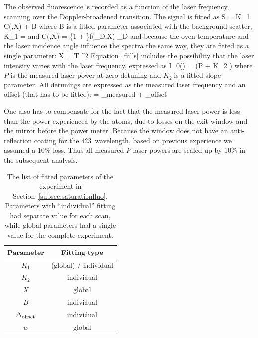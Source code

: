 The observed fluorescence is recorded as a function of the laser frequency, scanning over the Doppler-broadened transition. The signal is fitted as
\be 
S = K_1 C(\Delta,X) + B  
\label{fulls}
\ee
where B is a fitted parameter associated with the background scatter, 
\be
K_1 = 
\ee
and
\be
C(\Delta,X) = \int \ln \left\{1 + \right\}f(\Delta_D,X) \der\Delta_D
\ee
and because the oven temperature and the laser incidence angle influence the spectra the same way, they are fitted as a single parameter:
\be 
X = T \cos^2 \theta
\label{tcosth}
\ee
Equation~\ref{fulls} includes the possibility that the laser intensity varies with the laser frequency, expressed as
\be
I_0(\Delta) =  (P + K_2 \Delta)
\ee
where $P$ is the measured laser power at zero detuning and $K_2$ is a fitted slope parameter. All detunings are expressed as the measured laser frequency and an offset (that has to be fitted):
\be
\Delta = \Delta_{\rm measured} + \Delta_{\rm offset}
\ee

One also has to compensate for the fact that the measured laser power is less than the power experienced by the atoms, due to losses on the exit window and the mirror before the power meter. Because the window does not have an anti-reflection coating for the 423\nm\, wavelength, based on previous experience we assumed a 10\% loss. Thus all measured $P$ laser powers are scaled up by 10\% in the subsequent analysis.


\begin{table}[t]
\begin{center}
\begin{tabular}{|c|c|}
\hline \textbf{Parameter} & \textbf{Fitting type}  \\ 
\hline 
$K_1$ & (global) / individual \\
$K_2$ & individual \\
$X$ & global \\
$B$ & individual \\
$\Delta_{\rm offset}$ & individual \\
$w$ & global \\
\hline 
\end{tabular} 
\caption{The list of fitted parameters of the experiment in Section~\ref{subsec:saturationfluo}. Parameters with ``individual'' fitting had separate value for each scan, while global parameters had a single value for the complete experiment.}
\label{tab:neutralfluofit2}
\end{center}
\end{table}

